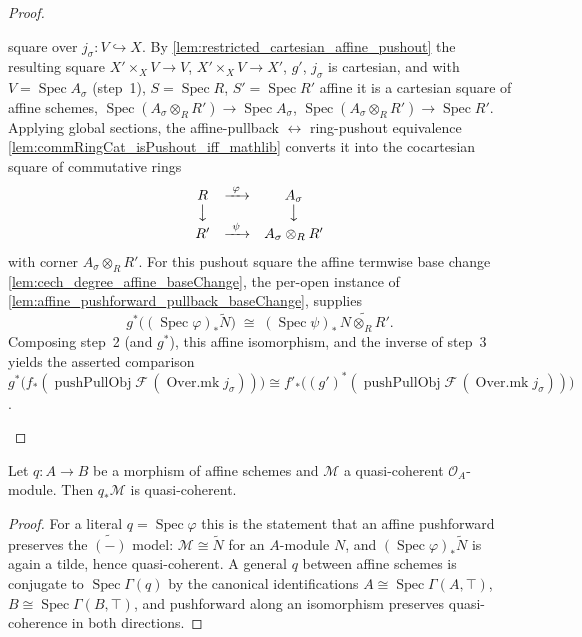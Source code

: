 \begin{proof}
\begin{enumerate}
      square over \(j_\sigma : V \hookrightarrow X\). By
      \cref{lem:restricted_cartesian_affine_pushout} the resulting square
      \(X' \times_X V \to V\), \(X' \times_X V \to X'\), \(g'\), \(j_\sigma\) is cartesian, and
      with \(V = \operatorname{Spec} A_\sigma\) (step~1), \(S = \operatorname{Spec} R\),
      \(S' = \operatorname{Spec} R'\) affine it is a cartesian square of affine schemes,
      \(\operatorname{Spec}(A_\sigma \otimes_R R') \to \operatorname{Spec} A_\sigma\),
      \(\operatorname{Spec}(A_\sigma \otimes_R R') \to \operatorname{Spec} R'\). Applying global
      sections, the affine-pullback \(\leftrightarrow\) ring-pushout equivalence
      \cref{lem:commRingCat_isPushout_iff_mathlib} converts it into the cocartesian square of
      commutative rings
      \[
        \begin{array}{ccc}
          R & \xrightarrow{\ \varphi\ } & A_\sigma\\
          \big\downarrow & & \big\downarrow\\
          R' & \xrightarrow{\ \psi\ } & A_\sigma \otimes_R R'
        \end{array}
      \]
      with corner \(A_\sigma \otimes_R R'\). For this pushout square the affine termwise base
      change \cref{lem:cech_degree_affine_baseChange}, the per-open instance of
      \cref{lem:affine_pushforward_pullback_baseChange}, supplies
      \[
        g^*\bigl((\operatorname{Spec}\varphi)_*\widetilde{N}\bigr)
          \;\cong\; (\operatorname{Spec}\psi)_*\,\widetilde{N \otimes_R R'}.
      \]
      Composing step~2 (and \(g^*\)), this affine isomorphism, and the inverse of step~3 yields
      the asserted comparison
      \(g^*\bigl(f_*(\operatorname{pushPullObj}\mathcal{F}\,(\operatorname{Over.mk}
      j_\sigma))\bigr) \cong f'_*\bigl((g')^*(\operatorname{pushPullObj}\mathcal{F}\,
      (\operatorname{Over.mk} j_\sigma))\bigr)\).
  \end{enumerate}
\end{proof}

\begin{lemma}\leanok
  \label{lem:isQuasicoherent_pushforward_of_isAffine}
  Let \(q : A \to B\) be a morphism of affine schemes and \(\mathcal{M}\) a quasi-coherent
  \(\mathcal{O}_A\)-module. Then \(q_*\mathcal{M}\) is quasi-coherent.
\end{lemma}

\begin{proof}\leanok
  For a literal \(q = \operatorname{Spec}\varphi\) this is the statement that an affine
  pushforward preserves the \(\widetilde{(-)}\) model: \(\mathcal{M} \cong \widetilde{N}\)
  for an \(A\)-module \(N\), and \((\operatorname{Spec}\varphi)_*\widetilde{N}\) is again a
  tilde, hence quasi-coherent. A general \(q\) between affine schemes is conjugate to
  \(\operatorname{Spec}\Gamma(q)\) by the canonical identifications
  \(A \cong \operatorname{Spec}\Gamma(A,\top)\), \(B \cong \operatorname{Spec}\Gamma(B,\top)\),
  and pushforward along an isomorphism preserves quasi-coherence in both directions.
\end{proof}

